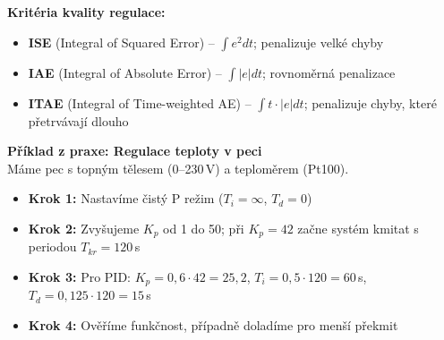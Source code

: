 \documentclass[a4paper,10pt]{article}
\begin{document}
\begin{vysvetlenibox}
\textbf{Kritéria kvality regulace:}
\begin{itemize}[noitemsep, leftmargin=1.4em, topsep=4pt]
    \item \textbf{ISE} (Integral of Squared Error) -- $\int e^2 dt$;
          penalizuje velké chyby
    \item \textbf{IAE} (Integral of Absolute Error) -- $\int |e| dt$;
          rovnoměrná penalizace
    \item \textbf{ITAE} (Integral of Time-weighted AE) -- $\int t \cdot |e| dt$;
          penalizuje chyby, které přetrvávají dlouho
\end{itemize}

\begin{center}
\end{center}

\textbf{Příklad z praxe: Regulace teploty v peci}\\
Máme pec s topným tělesem (0--230\,V) a teploměrem (Pt100).
\begin{itemize}[noitemsep, leftmargin=1.4em, topsep=4pt]
    \item \textbf{Krok 1:} Nastavíme čistý P režim ($T_i=\infty$, $T_d=0$)
    \item \textbf{Krok 2:} Zvyšujeme $K_p$ od 1 do 50; při $K_p=42$ začne systém
          kmitat s periodou $T_{kr} = 120$\,s
    \item \textbf{Krok 3:} Pro PID: $K_p = 0{,}6 \cdot 42 = 25{,}2$,
          $T_i = 0{,}5 \cdot 120 = 60$\,s, $T_d = 0{,}125 \cdot 120 = 15$\,s
    \item \textbf{Krok 4:} Ověříme funkčnost, případně doladíme pro menší překmit
\end{itemize}
\end{vysvetlenibox}
\end{document}
